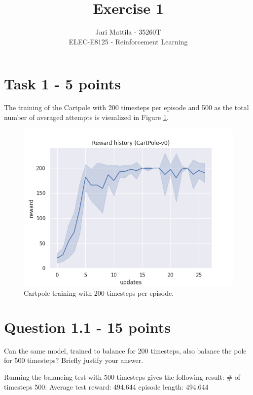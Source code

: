 \documentclass[12pt]{article}
\begin{document}
 
\title{Exercise 1}
\author{Jari Mattila - 35260T\\
ELEC-E8125 - Reinforcement Learning}

\maketitle
\section*{Task 1 - 5 points}

\noindent
The training of the Cartpole with 200 timesteps per episode and 500 as the total number of averaged attempts is visualized in Figure \ref*{fig:fig1}.   

  


\begin{figure}[h] 
	\centering  %
    \includegraphics[width=0.8\columnwidth]{img/Figure_task1.png}
	\caption{Cartpole training with 200 timesteps per episode.}
	\label{fig:fig1}
\end{figure}


\section*{Question 1.1 - 15 points}

Can the same model, trained to balance for 200 timesteps, also balance the pole for 500 timesteps? Briefly justify your answer.
\newline

\noindent
Running the balancing test with 500 timesteps gives the following result:  
\newline
\indent
\# of timesteps 500: Average test reward: 494.644 episode length: 494.644
\newline
\end{document}
